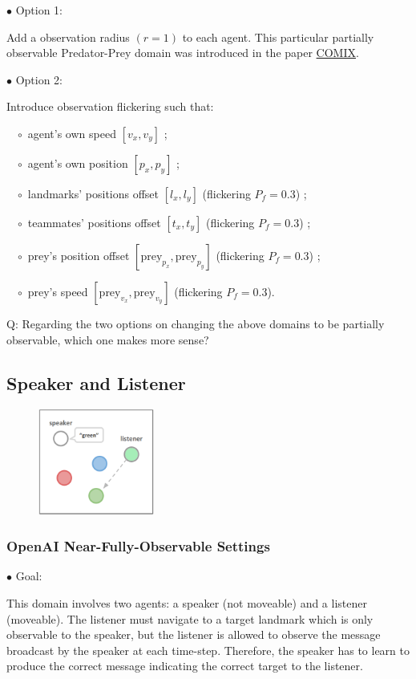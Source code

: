 \documentclass{article}
\begin{document}
$\bullet$ Option 1: 

Add a observation radius $(r=1)$ to each agent. This particular partially observable Predator-Prey domain was introduced in the paper \href{http://aaai-rlg.mlanctot.info/papers/AAAI20-RLG_paper_15.pdf}{COMIX}.

$\bullet$ Option 2:

Introduce observation flickering such that:

$\,\,\,\,\,\circ$ agent's own speed $[v_x, v_y]$ ;

$\,\,\,\,\,\circ$ agent's own position $[p_x, p_y]$ ;

$\,\,\,\,\,\circ$ landmarks' positions offset $[l_x, l_y]$ (flickering $P_f=0.3$) ;

$\,\,\,\,\,\circ$ teammates' positions offset $[t_x, t_y]$ (flickering $P_f=0.3$) ;

$\,\,\,\,\,\circ$ prey's position offset $[\text{prey}_{p_x}, \text{prey}_{p_y}]$ (flickering $P_f=0.3$) ;

$\,\,\,\,\,\circ$ prey's speed $[\text{prey}_{v_x}, \text{prey}_{v_y}]$ (flickering $P_f=0.3$).

{\color{red} Q: Regarding the two options on changing the above domains to be partially observable, which one makes more sense?}


\subsection{Speaker and Listener}

\begin{figure}[h!]
    \centering
    \includegraphics[height=3.5cm]{sp_lis.png}
\end{figure}

\subsubsection{OpenAI Near-Fully-Observable Settings}

$\bullet$ Goal:

This domain involves two agents: a speaker (not moveable) and a listener (moveable). The listener must navigate to a target landmark which is only observable to the speaker, but the listener is allowed to observe the message broadcast by the speaker at each time-step. Therefore, the speaker has to learn to produce the correct message indicating the correct target to the listener.    
\end{document}
